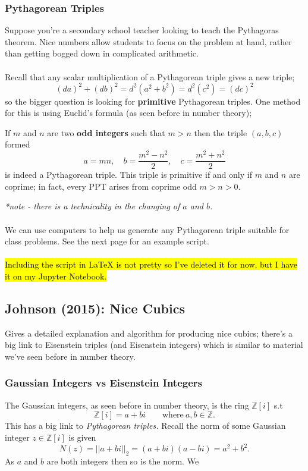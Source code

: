 \documentclass[12pt]{article}
\newcommand{\Z}{\mathbb{Z}}
\begin{document}
\subsubsection{Pythagorean Triples}
Suppose you're a secondary school teacher looking to teach the Pythagoras theorem. Nice numbers allow students to focus on the problem at hand, rather than getting bogged down in complicated arithmetic.\\\\
Recall that any scalar multiplication of a Pythagorean triple gives a new triple;
\begin{equation*}
    (da)^2 + (db)^2 = d^2(a^2 + b^2) = d^2(c^2) = (dc)^2
\end{equation*}
so the bigger question is looking for \textbf{primitive} Pythagorean triples. One method for this is using Euclid's formula (as seen before in number theory);
\begin{thm}{}{}
If $m$ and $n$ are two \textbf{odd integers} such that $m > n$ then the triple $(a, b, c)$ formed
\begin{equation*}
    a = mn,\quad b = \frac{m^2 - n^2}{2},\quad c = \frac{m^2 + n^2}{2}
\end{equation*}
is indeed a Pythagorean triple. This triple is primitive if and only if $m$ and $n$ are coprime; in fact, every PPT arises from coprime odd $m > n > 0$.
\end{thm}
\textit{*note - there is a technicality in the changing of $a$ and $b$.}\\\\
We can use computers to help us generate any Pythagorean triple suitable for class problems. See the next page for an example script.\\\\
\hl{Including the script in \LaTeX{} is not pretty so I've deleted it for now, but I have it on my Jupyter Notebook.}

\subsection{Johnson (2015): Nice Cubics}
Gives a detailed explanation and algorithm for producing nice cubics; there's a big link to Eisenstein triples (and Eisenstein integers) which is similar to material we've seen before in number theory.

\subsubsection{Gaussian Integers vs Eisenstein Integers}
The Gaussian integers, as seen before in number theory, is the ring $\Z[i]$ s.t
\begin{equation*}
    \Z[i] = a + bi \qquad \text{where}~a,b\in \Z.
\end{equation*}
This has a big link to \textit{Pythagorean triples.} Recall the norm of some Gaussian integer $z \in \Z[i]$ is given
\begin{equation*}
    N(z) = ||a+bi||_2 = (a+bi)(a-bi) = a^2 + b^2.
\end{equation*}
As $a$ and $b$ are both integers then so is the norm. We 
\end{document}
